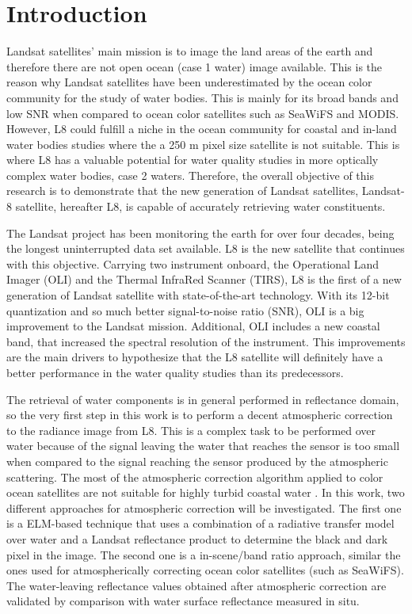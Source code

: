 \chapter{Introduction}
\label{ch:introduction}
Landsat satellites' main mission is to image the land areas of the earth and therefore there are not open ocean (case 1 water) image available. This is the reason why Landsat satellites have been underestimated by the ocean color community for the study of water bodies. This is mainly for its broad bands and low SNR when compared to ocean color satellites such as SeaWiFS and MODIS. However, L8 could fulfill a niche in the ocean community for coastal and in-land water  bodies studies where the a 250 m pixel size satellite is not suitable. This is where L8 has a valuable potential for water quality studies in more optically complex water bodies, case 2 waters. Therefore, the overall objective of this research is to demonstrate that the new generation of Landsat satellites, Landsat-8 satellite, hereafter L8, is capable of accurately retrieving water constituents. 

The Landsat project has been monitoring the earth for over four decades, being the longest uninterrupted data set available. L8 is the new satellite that continues with this objective. Carrying two instrument onboard, the Operational Land Imager (OLI) and the Thermal InfraRed Scanner (TIRS), L8 is the first of a new generation of Landsat satellite with state-of-the-art technology. With its 12-bit quantization and so much better signal-to-noise ratio (SNR), OLI is a big improvement to the Landsat mission. Additional, OLI includes a new coastal band, that increased the spectral resolution of the instrument. This improvements are the main drivers to hypothesize that the L8 satellite will definitely have a better performance in the water quality studies than its predecessors. 

The retrieval of water components is {\color{red} in general performed in reflectance domain}, so the very first step in this work is to perform a {\color{red} decent} atmospheric correction to the radiance image from L8. This is a complex task to be performed over water because of the signal leaving the water that reaches the sensor is too small when compared to the signal reaching the sensor produced by the atmospheric scattering. The most of the atmospheric correction algorithm applied to color ocean satellites are not suitable for highly turbid coastal water \cite{Patt2003}. In this work, two different approaches for atmospheric correction will be investigated. The first one is a ELM-based technique that uses a combination of a radiative transfer model over water and a Landsat reflectance product to determine the black and dark pixel in the image. The second one is a in-scene/band ratio approach, similar the ones used for atmospherically correcting ocean color satellites (such as SeaWiFS). The water-leaving reflectance values obtained after atmospheric correction are validated by comparison with water surface reflectance measured in situ. 

